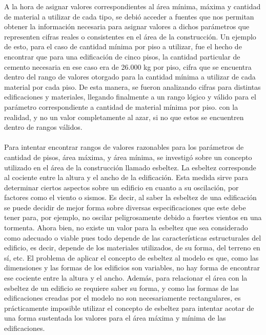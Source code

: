 \documentclass[letterpaper]{article}
\begin{document}
A la hora de asignar valores correspondientes al área mínima, máxima y cantidad de material a utilizar de cada tipo, se debió acceder a fuentes
que nos permitan obtener la información necesaria para asignar valores a dichos parámetros que representen cifras reales o consistentes en el área de la construcción. Un ejemplo de esto, para el caso de cantidad
mínima por piso a utilizar, fue el hecho de encontrar que para una edificación de cinco pisos, la cantidad particular de cemento necesaria en ese caso era de 26.000 kg por piso, cifra que se encuentra
dentro del rango de valores otorgado para la cantidad mínima a utilizar de cada material por cada piso. De esta manera, se fueron analizando cifras
para distintas edificaciones y materiales, llegando finalmente a un rango lógico y válido para el parámetro correspondiente a cantidad de material mínima por piso.
con la realidad, y no un valor completamente al azar, si no que estos se encuentren dentro de rangos válidos.\\ \\
Para intentar encontrar rangos de valores razonables para los parámetros de cantidad de pisos, área máxima, y área mínima, 
se investigó sobre un concepto utilizado en el área de la construcción llamado esbeltez. La esbeltez corresponde al cociente entre la altura y el ancho
de la edificación. Esta medida sirve para determinar ciertos aspectos sobre un edificio en cuanto a su oscilación, por factores como el viento o
sismos. Es decir, al saber la esbeltez de una edificación se puede decidir de mejor forma sobre diversas especificaciones que este debe tener para,
por ejemplo, no oscilar peligrosamente debido a fuertes vientos en una tormenta. Ahora bien, no existe un valor para la esbeltez que sea considerado
como adecuado o viable pues todo depende de las características estructurales del edificio, es decir, depende de los materiales utilizados, de su
forma, del terreno en sí, etc. El problema de aplicar el concepto de esbeltez al modelo es que, como las dimensiones y las formas de los edificios
son variables, no hay forma de encontrar ese cociente entre la altura y el ancho. Además, para relacionar el área con la esbeltez de un edificio se
requiere saber su forma, y como las formas de las edificaciones creadas por el modelo no son necesariamente 
rectangulares, es prácticamente imposible utilizar el concepto de esbeltez para intentar acotar de una forma sustentada los valores para el área
máxima y mínima de las edificaciones. \newline \newline
\end{document}
